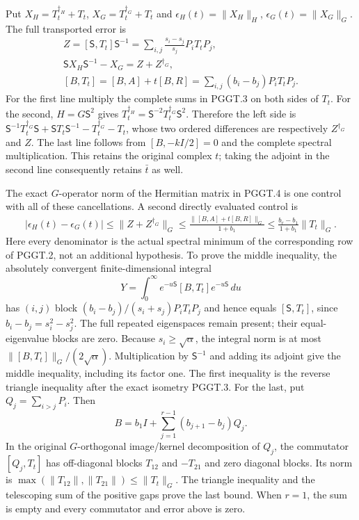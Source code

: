 Put $X_H=T_t^{\dagger_H}+T_t$,
$X_G=T_t^{\dagger_G}+T_t$ and
$\epsilon_H(t)=\|X_H\|_H$,
$\epsilon_G(t)=\|X_G\|_G$. The full transported error is
\[
\begin{gathered}
 Z=[\mathsf S,T_t]\mathsf S^{-1}
   =\sum_{i,j}\frac{s_i-s_j}{s_j}P_iT_tP_j,\\
 \mathsf S X_H\mathsf S^{-1}-X_G
                           =Z+Z^{\dagger_G},\\
 [B,T_t]=[B,A]+t[B,R]
            =\sum_{i,j}(b_i-b_j)P_iT_tP_j.
\end{gathered}
\tag{PGGT.4}\label{GraphV2:eq:pggt-entire-error}
\]
For the first line multiply the complete sums in PGGT.3 on
both sides of $T_t$. For the second, $H=G\mathsf S^2$
gives $T_t^{\dagger_H}=\mathsf S^{-2}
T_t^{\dagger_G}\mathsf S^2$. Therefore the left side
is $\mathsf S^{-1}T_t^{\dagger_G}\mathsf S
+\mathsf ST_t\mathsf S^{-1}-T_t^{\dagger_G}-T_t$,
whose two ordered differences are respectively
$Z^{\dagger_G}$ and $Z$. The last line follows from
$[B,-kI/2]=0$ and the complete spectral multiplication.
This retains the original complex $t$; taking the adjoint
in the second line consequently retains $\bar t$ as well.

The exact $G$-operator norm of the Hermitian matrix in
PGGT.4 is one control with all of these cancellations. A
second directly evaluated control is
\[
\begin{gathered}
 |\epsilon_H(t)-\epsilon_G(t)|
 \leq\|Z+Z^{\dagger_G}\|_G
 \leq\frac{\|[B,A]+t[B,R]\|_G}{1+b_1}
 \leq\frac{b_r-b_1}{1+b_1}\|T_t\|_G.
\end{gathered}
\tag{PGGT.5}\label{GraphV2:eq:pggt-concrete-generator-control}
\]
Here every denominator is the actual spectral minimum of
the corresponding row of PGGT.2, not an additional
hypothesis. To prove the middle inequality, the absolutely
convergent finite-dimensional integral
\[
 Y=\int_0^\infty
 e^{-u\mathsf S}[B,T_t]e^{-u\mathsf S}\,du
\]
has $(i,j)$ block $(b_i-b_j)/(s_i+s_j)P_iT_tP_j$
and hence equals $[\mathsf S,T_t]$, since
$b_i-b_j=s_i^2-s_j^2$. The full repeated eigenspaces
remain present; their equal-eigenvalue blocks are zero.
Because $s_i\geq\sqrt\alpha$, the integral norm is
at most $\|[B,T_t]\|_G/(2\sqrt\alpha)$.
Multiplication by $\mathsf S^{-1}$ and adding its adjoint
give the middle inequality, including its factor one.
The first inequality is the reverse triangle inequality
after the exact isometry PGGT.3. For the last, put
$Q_j=\sum_{i>j}P_i$. Then
\[
 B=b_1I+\sum_{j=1}^{r-1}(b_{j+1}-b_j)Q_j.
\]
In the original $G$-orthogonal image/kernel decomposition
of $Q_j$, the commutator $[Q_j,T_t]$ has off-diagonal
blocks $T_{12}$ and $-T_{21}$ and zero diagonal blocks.
Its norm is $\max(\|T_{12}\|,\|T_{21}\|)\leq\|T_t\|_G$.
The triangle inequality and the telescoping sum of the
positive gaps prove the last bound. When $r=1$, the sum
is empty and every commutator and error above is zero.

